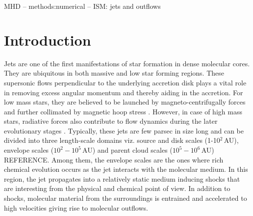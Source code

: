 \documentclass[useAMS,usenatbib,letters]{mn2e}
\newcommand{\refer}{{\color{orange}REFERENCE}}
\begin{document}
   \begin{keywords}
    MHD -- methods:numerical -- ISM: jets and outflows
   \end{keywords}


%
%


\section{Introduction}
Jets are one of the first manifestations of star
formation in dense molecular cores. They are ubiquitous in both
massive and low star forming regions. These supersonic flows
perpendicular to the underlying accretion disk plays a vital role in
removing excess angular momentum and thereby aiding in the accretion. 
For low mass stars, they are believed to be launched by magneto-centrifugally forces and
further collimated by magnetic hoop stress
\citep[][]{Blandford:1982p892, Konigl:2000p607}. However, in case of
high mass stars, radiative forces also contribute to flow dynamics
during the later evolutionary stages \cite{Vaidya:2011p8992}. 
Typically, these jets are few parsec in size long and can be divided into
three length-scale domains viz. source and disk scales (1-10$^{2}\,$AU),
envelope scales ($10^{2} - 10^{5}$\,AU) and parent cloud scales
($10^{5} - 10^{6}$\,AU) \refer. Among them, the envelope scales are
the ones where rich chemical evolution occurs as the jet interacts
with the molecular medium. In this region, the jet propagates into a
relatively static medium inducing shocks that are interesting from the
physical and chemical point of view. In addition to shocks, molecular
material from the surroundings is entrained and accelerated to high
velocities giving rise to molecular outflows.
%
\end{document}
